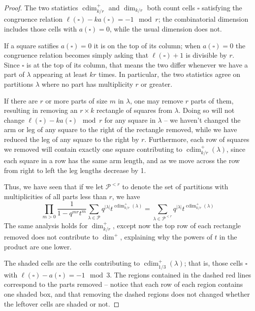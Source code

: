 \documentclass{amsart}[12pt]
\theoremstyle{definition}
\newcommand{\PP}{\mathcal{P}} %
\DeclareMathOperator{\cdim}{cdim}
\begin{document}
\begin{proof}
The two statistics $\cdim^+_{k/r}$ and $\dim_{k/r}$ both count cells $\square$ satisfying the congruence relation $\ell(\square)-ka(\square)=-1\mod r$; the combinatorial dimension includes those cells with $a(\square)=0$, while the usual dimension does not.  

If a square satifies $a(\square)=0$ it is on the top of its column; when $a(\square)=0$ the congruence relation becomes simply asking that $\ell(\square)+1$ is divisible by $r$. Since $\square$ is at the top of its column, that means the two differ whenever we have a part of $\lambda$ appearing at least $kr$ times.  In particular, the two statistics agree on partitions $\lambda$ where no part has multiplicity $r$ or greater.

If there are $r$ or more parts of size $m$ in $\lambda$, one may remove $r$ parts of them, resulting in removing an $r\times k$ rectangle of squares from $\lambda$.  Doing so will not change $\ell(\square)-ka(\square)\mod r$ for any square in $\lambda$ -- we haven't changed the arm or leg of any square to the right of the rectangle removed, while we have reduced the leg of any square to the right by $r$.  Furthermore, each row of squares we removed will contain exactly one square contributing to $\cdim^+_{k/r}(\lambda)$, since each square in a row has the same arm length, and as we move across the row from right to left the leg lengths decrease by 1.  

Thus, we have seen that if we let $\PP^{<r}$ to denote the set of partitions with multiplicities of all parts less than $r$, we have
$$\prod_{m>0}\frac{1}{1-q^{mr}t^m}\sum_{\lambda\in\PP} q^{|\lambda|}t^{\cdim^+_{k/r}(\lambda)}=\sum_{\lambda\in\PP^{<r}}q^{|\lambda|}t^{\cdim^+_{k/r}(\lambda)}$$
The same analysis holds for $\dim^+_{k/r}$, except now the top row of each rectangle removed does not contribute to $\dim^+$, explaining why the powers of $t$ in the product are one lower.

The shaded cells are the cells contributing to $\cdim^+_{1/3}(\lambda)$; that is, those cells $\square$ with $\ell(\square)-a(\square)=-1\mod 3$.  The regions contained in the dashed red lines correspond to the parts removed -- notice that each row of each region contains one shaded box, and that removing the dashed regions does not changed whether the leftover cells are shaded or not.


\end{proof}
\end{document}
